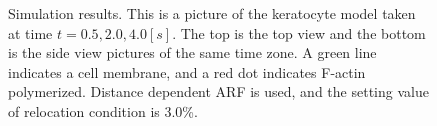 \documentclass[a4paper,12pt]{book}
\begin{document}
\begin{figure}[h]
{\begin{tabular}{c}
  \end{tabular}
 }%
 \caption{Simulation results. This is a picture of the keratocyte model taken at time $t = 0.5, 2.0, 4.0 [s]$. The top is the top view and the bottom is the side view pictures of the same time zone. A green line indicates a cell membrane, and a red dot indicates F-actin polymerized. Distance dependent ARF is used, and the setting value of relocation condition is 3.0\%.}
 \label{fig:res0}
\end{figure}
\end{document}
